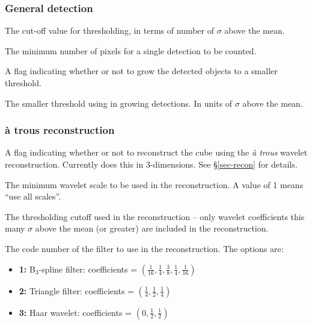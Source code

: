 \documentclass[12pt]{article}
\newcommand{\entrylabel}[1]{\mbox{\textsf{\bf{#1:}}}\hfil}
\newenvironment{entry}
        {\begin{list}{}%
                {\renewcommand{\makelabel}{\entrylabel}%
                        \setlength{\labelwidth}{30mm}%
                        \setlength{\labelsep}{5pt}%
                        \setlength{\itemsep}{2pt}%
                        \setlength{\parsep}{2pt}%
                        \setlength{\leftmargin}{35mm}%
                }%
        }%
{\end{list}}
\begin{document}
\subsubsection*{General detection}
\begin{entry}
\item[snrCut {\tt [3.]}] The cut-off value for thresholding, in terms
  of number of $\sigma$ above the mean.
\item[minPix {\tt [3]}] The minimum number of pixels for a single
  detection to be counted.
\item[flagGrowth {\tt [true]}] A flag indicating whether or not to
  grow the detected objects to a smaller threshold.
\item[growthCut {\tt [1.5]}] The smaller threshold using in growing
  detections. In units of $\sigma$ above the mean.
\end{entry}

\subsubsection*{{\` a} trous reconstruction}
\begin{entry}
\item [flagATrous {\tt [true]}] A flag indicating whether or not to
  reconstruct the cube using the {\it {\`a} trous} wavelet
  reconstruction. Currently does this in 3-dimensions. See
  \S\ref{sec-recon} for details.
\item[scaleMin {\tt [1]}] The minimum wavelet scale to be used in the
  reconstruction. A value of 1 means ``use all scales''.
\item[snrRecon {\tt [4]}] The thresholding cutoff used in the
  reconstruction -- only wavelet coefficients this many $\sigma$ above
  the mean (or greater) are included in the reconstruction. 
\item[filterCode {\tt [2]}] The code number of the filter to use in
  the reconstruction. The options are:
  \begin{itemize}
  \item {\bf 1:} B$_3$-spline filter: coefficients = 
    $(\frac{1}{16}, \frac{1}{4}, \frac{3}{8}, \frac{1}{4}, \frac{1}{16})$
  \item {\bf 2:} Triangle filter: coefficients = $(\frac{1}{4}, \frac{1}{2}, \frac{1}{4})$
  \item {\bf 3:} Haar wavelet: coefficients = $(0, \frac{1}{2}, \frac{1}{2})$
  \end{itemize}
\end{entry}
\end{document}
